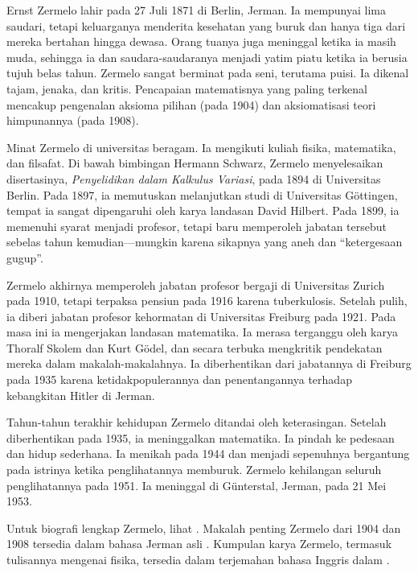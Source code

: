 \documentclass[../../../include/open-logic-section]{subfiles}
\begin{document}



Ernst Zermelo lahir pada 27 Juli 1871 di Berlin, Jerman. Ia mempunyai lima
saudari, tetapi keluarganya menderita kesehatan yang buruk dan hanya tiga
dari mereka bertahan hingga dewasa. Orang tuanya juga meninggal ketika ia
masih muda, sehingga ia dan saudara-saudaranya menjadi yatim piatu ketika ia
berusia tujuh belas tahun. Zermelo sangat berminat pada seni, terutama puisi. Ia
dikenal tajam, jenaka, dan kritis. Pencapaian matematisnya yang paling
terkenal mencakup pengenalan aksioma pilihan (pada 1904) dan aksiomatisasi
teori himpunannya (pada 1908).

Minat Zermelo di universitas beragam. Ia mengikuti kuliah fisika, matematika,
dan filsafat. Di bawah bimbingan Hermann Schwarz, Zermelo menyelesaikan
disertasinya, \emph{Penyelidikan dalam Kalkulus Variasi}, pada 1894 di
Universitas Berlin. Pada 1897, ia memutuskan melanjutkan studi di Universitas
G\"{o}ttingen, tempat ia sangat dipengaruhi oleh karya landasan David
Hilbert. Pada 1899, ia memenuhi syarat menjadi profesor, tetapi baru
memperoleh jabatan tersebut sebelas tahun kemudian---mungkin karena sikapnya
yang aneh dan ``ketergesaan gugup''.

Zermelo akhirnya memperoleh jabatan profesor bergaji di Universitas Zurich
pada 1910, tetapi terpaksa pensiun pada 1916 karena tuberkulosis. Setelah
pulih, ia diberi jabatan profesor kehormatan di Universitas Freiburg pada
1921. Pada masa ini ia mengerjakan landasan matematika. Ia merasa terganggu
oleh karya Thoralf Skolem dan Kurt G\"{o}del, dan secara terbuka mengkritik
pendekatan mereka dalam makalah-makalahnya. Ia diberhentikan dari jabatannya
di Freiburg pada 1935 karena ketidakpopulerannya dan penentangannya terhadap
kebangkitan Hitler di Jerman.

Tahun-tahun terakhir kehidupan Zermelo ditandai oleh keterasingan. Setelah
diberhentikan pada 1935, ia meninggalkan matematika. Ia pindah ke pedesaan
dan hidup sederhana. Ia menikah pada 1944 dan menjadi sepenuhnya bergantung
pada istrinya ketika penglihatannya memburuk. Zermelo kehilangan seluruh
penglihatannya pada 1951. Ia meninggal di G\"{u}nterstal, Jerman, pada
21 Mei 1953.

\begin{reading}
Untuk biografi lengkap Zermelo, lihat \citet{Ebbinghaus2015}. Makalah
penting Zermelo dari 1904 dan 1908 tersedia dalam bahasa Jerman asli
\citep{Zermelo1904,Zermelo1908}. Kumpulan karya Zermelo, termasuk
tulisannya mengenai fisika, tersedia dalam terjemahan bahasa Inggris dalam
\citep{Ebbinghaus2010,Ebbinghaus2013}.
\end{reading}
\end{document}
